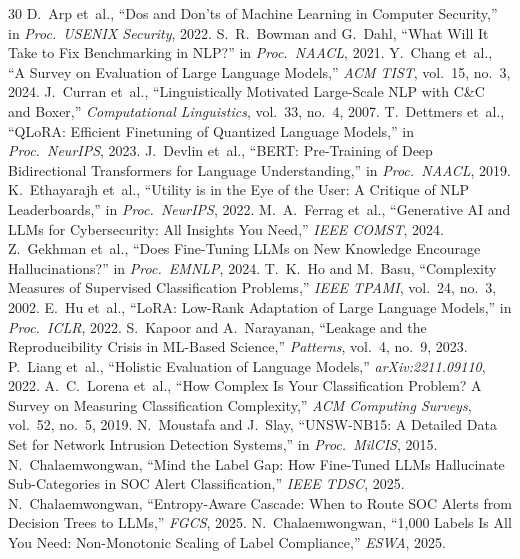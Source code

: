 \documentclass[review,3p]{elsarticle}
\begin{document}
\begin{thebibliography}{30}
 D.~Arp et~al., ``Dos and Don'ts of Machine Learning in Computer Security,'' in \emph{Proc.\ USENIX Security}, 2022.
 S.~R.~Bowman and G.~Dahl, ``What Will It Take to Fix Benchmarking in NLP?'' in \emph{Proc.\ NAACL}, 2021.
 Y.~Chang et~al., ``A Survey on Evaluation of Large Language Models,'' \emph{ACM TIST}, vol.~15, no.~3, 2024.
 J.~Curran et~al., ``Linguistically Motivated Large-Scale NLP with C\&C and Boxer,'' \emph{Computational Linguistics}, vol.~33, no.~4, 2007.
 T.~Dettmers et~al., ``QLoRA: Efficient Finetuning of Quantized Language Models,'' in \emph{Proc.\ NeurIPS}, 2023.
 J.~Devlin et~al., ``BERT: Pre-Training of Deep Bidirectional Transformers for Language Understanding,'' in \emph{Proc.\ NAACL}, 2019.
 K.~Ethayarajh et~al., ``Utility is in the Eye of the User: A Critique of NLP Leaderboards,'' in \emph{Proc.\ NeurIPS}, 2022.
 M.~A.~Ferrag et~al., ``Generative AI and LLMs for Cybersecurity: All Insights You Need,'' \emph{IEEE COMST}, 2024.
 Z.~Gekhman et~al., ``Does Fine-Tuning LLMs on New Knowledge Encourage Hallucinations?'' in \emph{Proc.\ EMNLP}, 2024.
 T.~K.~Ho and M.~Basu, ``Complexity Measures of Supervised Classification Problems,'' \emph{IEEE TPAMI}, vol.~24, no.~3, 2002.
 E.~Hu et~al., ``LoRA: Low-Rank Adaptation of Large Language Models,'' in \emph{Proc.\ ICLR}, 2022.
 S.~Kapoor and A.~Narayanan, ``Leakage and the Reproducibility Crisis in ML-Based Science,'' \emph{Patterns}, vol.~4, no.~9, 2023.
 P.~Liang et~al., ``Holistic Evaluation of Language Models,'' \emph{arXiv:2211.09110}, 2022.
 A.~C.~Lorena et~al., ``How Complex Is Your Classification Problem? A Survey on Measuring Classification Complexity,'' \emph{ACM Computing Surveys}, vol.~52, no.~5, 2019.
 N.~Moustafa and J.~Slay, ``UNSW-NB15: A Detailed Data Set for Network Intrusion Detection Systems,'' in \emph{Proc.\ MilCIS}, 2015.
 N.~Chalaemwongwan, ``Mind the Label Gap: How Fine-Tuned LLMs Hallucinate Sub-Categories in SOC Alert Classification,'' \emph{IEEE TDSC}, 2025.
 N.~Chalaemwongwan, ``Entropy-Aware Cascade: When to Route SOC Alerts from Decision Trees to LLMs,'' \emph{FGCS}, 2025.
 N.~Chalaemwongwan, ``1,000 Labels Is All You Need: Non-Monotonic Scaling of Label Compliance,'' \emph{ESWA}, 2025.

\end{thebibliography}
\end{document}
